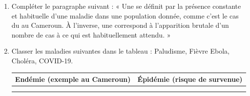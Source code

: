 \documentclass[11pt]{article}
\begin{document}
\begin{exercice}
\begin{enumerate}
    \item Compléter le paragraphe suivant : « Une \underline{\hspace{4cm}} se définit par la présence constante et habituelle d'une maladie dans une population donnée, comme c'est le cas du \underline{\hspace{3cm}} au Cameroun. À l'inverse, une \underline{\hspace{4cm}} correspond à l'apparition brutale d'un nombre de cas \underline{\hspace{3cm}} à ce qui est habituellement attendu. »
    \item Classer les maladies suivantes dans le tableau : Paludisme, Fièvre Ebola, Choléra, COVID-19.
    \begin{tabular}{|l|l|}
    \hline
    \textbf{Endémie (exemple au Cameroun)} & \textbf{Épidémie (risque de survenue)} \\
    \hline
    & \\
    \hline
    & \\
    \hline
    \end{tabular}
\end{enumerate}
\end{exercice}
\end{document}
